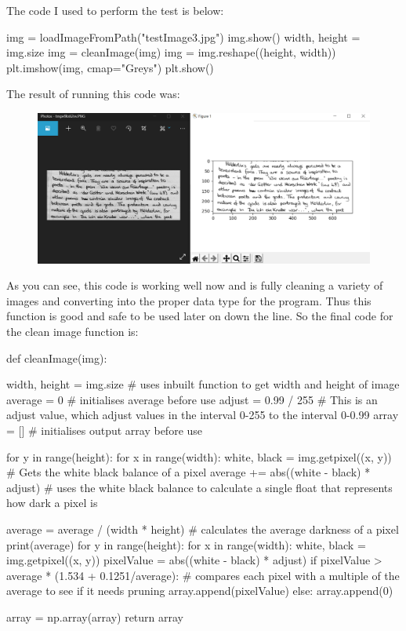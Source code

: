 \documentclass{report}
\begin{document}
\noindent The code I used to perform the test is below:
\begin{python}
img = loadImageFromPath("testImage3.jpg")
img.show()
width, height = img.size
img = cleanImage(img)
img = img.reshape((height, width))
plt.imshow(img, cmap="Greys")
plt.show()
\end{python}
The result of running this code was:
\begin{figure}[H]
    \centering
    \includegraphics[width=5in]{Images/Development and Testing/Stage 4/Testing for Clean Image/Test 5, Working Now.png}
    \label{fig:Clean Image: Final Test}
\end{figure}
\noindent As you can see, this code is working well now and is fully cleaning a variety of images and converting into the proper data type for the program. Thus this function is good and safe to be used later on down the line. So the final code for the clean image function is:
\begin{python}
def cleanImage(img):

    width, height = img.size  # uses inbuilt function to get width and height of image
    average = 0  # initialises average before use
    adjust = 0.99 / 255  # This is an adjust value, which adjust values in the interval 0-255 to the interval 0-0.99
    array = []  # initialises output array before use

    for y in range(height):
        for x in range(width):
            white, black = img.getpixel((x, y))  # Gets the white black balance of a pixel
            average += abs((white - black) * adjust)  # uses the white black balance to calculate a single float that represents how dark a pixel is

    average = average / (width * height) # calculates the average darkness of a pixel
    print(average)
    for y in range(height):
        for x in range(width):
            white, black = img.getpixel((x, y))
            pixelValue = abs((white - black) * adjust)
            if pixelValue > average * (1.534 + 0.1251/average):  # compares each pixel with a multiple of the average to see if it needs pruning
                array.append(pixelValue)
            else:
                array.append(0)

    array = np.array(array)
    return array
\end{python}
\end{document}
